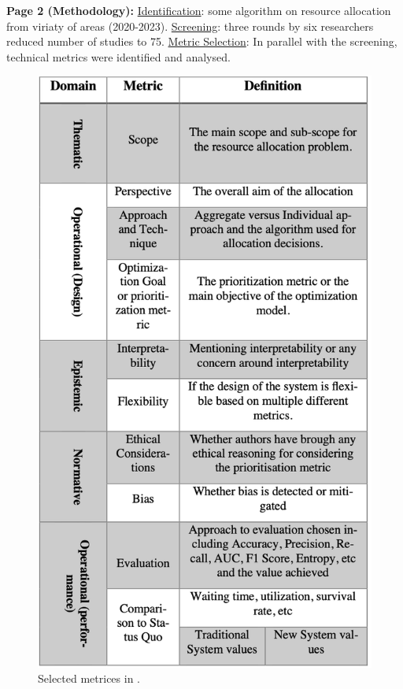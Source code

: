     \textbf{Page 2 (Methodology):}
    \underline{Identification}: some algorithm on resource allocation from viriaty of areas (2020-2023). \underline{Screening}: three rounds by six researchers reduced number of studies to 75. \underline{Metric Selection}: In parallel with the screening, technical metrics were identified and analysed.
    \begin{figure}[H]
        \centering
        \includegraphics[width=.64\textwidth]{figures/0017_AR01GB23/fig1.png}
        \caption{Selected metrices in \cite{x121}.}
        \label{fig1:0017_AR01GB23}
    \end{figure}
    
